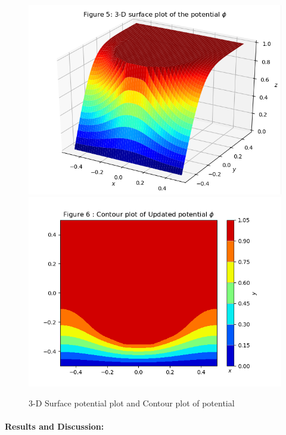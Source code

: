 \documentclass[11pt, a4paper]{article}
\begin{document}
\newpage
\begin{figure}[!tbh]
 \centering
 \includegraphics[scale=0.8]{./../Extras/Figure_5.png}  
 \includegraphics[scale=0.8]{./../Extras/Figure_6.png}  
 \caption{3-D Surface potential plot and Contour plot of potential}
\end{figure}
\newpage
\paragraph{Results and Discussion:}\label{results-and-discussion}
\end{document}
